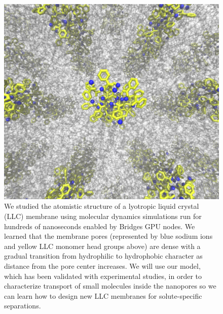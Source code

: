 \documentclass{article}
\begin{document}
\begin{figure}
\includegraphics[width=\textwidth]{toc_image_final.pdf}
\caption*{We studied the atomistic structure of a lyotropic liquid crystal
	(LLC) membrane using molecular dynamics simulations run for hundreds of
	nanoseconds enabled by Bridges GPU nodes. We learned that the membrane pores
	(represented by blue sodium ions and yellow LLC monomer head groups above) are
	dense with a gradual transition from hydrophilic to hydrophobic character as
	distance from the pore center increases. We will use our model, which has been
	validated with experimental studies, in order to characterize transport of
	small molecules inside the nanopores so we can learn how to design new LLC
	membranes for solute-specific separations.} 
\end{figure}
		
\end{document}

